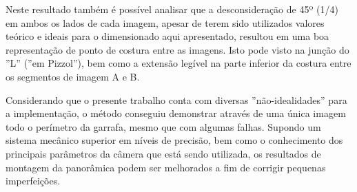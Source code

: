 Neste resultado também é possível analisar que a desconsideração de 45º (1/4) em ambos os lados de cada imagem, apesar de terem sido utilizados valores teórico e ideais para o dimensionado aqui apresentado, resultou em uma boa representação de ponto de costura entre as imagens. Isto pode visto na junção do ''L'' (''em Pizzol''), bem como a extensão legível na parte inferior da costura entre os segmentos de imagem A e B.

Considerando que o presente trabalho conta com diversas ''não-idealidades'' para a implementação, o método conseguiu demonstrar através de uma única imagem todo o perímetro da garrafa, mesmo que com algumas falhas. Supondo um sistema mecânico superior em níveis de precisão, bem como o conhecimento dos principais
parâmetros da câmera que está sendo utilizada, os resultados de montagem da panorâmica podem ser melhorados a fim de corrigir pequenas imperfeições.


